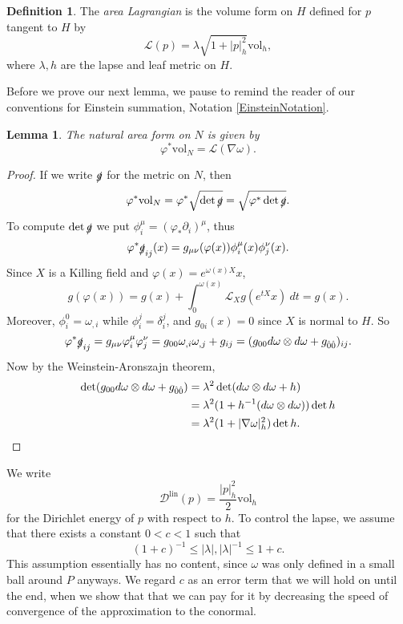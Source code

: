 \documentclass[reqno,12pt,letterpaper]{amsart}
\newcommand{\Lagrange}{\mathscr L}
\newcommand{\DirL}{\mathscr D^{\mathrm{lin}}}
\newcommand{\vol}{\mathrm{vol}}
\newcommand{\dfn}[1]{\emph{#1}\index{#1}}
\newtheorem{lemma}[theorem]{Lemma}
\theoremstyle{definition}
\newtheorem{definition}[theorem]{Definition}
\numberwithin{equation}{section}
\begin{document}
\begin{definition}
The \dfn{area Lagrangian} is the volume form on $H$ defined for $p$ tangent to $H$ by
$$\Lagrange(p) = \lambda \sqrt{1 + |p|_h^2} \vol_h,$$
where $\lambda,h$ are the lapse and leaf metric on $H$.
\end{definition}

Before we prove our next lemma, we pause to remind the reader of our conventions for Einstein summation, Notation \ref{EinsteinNotation}.

\begin{lemma}
The natural area form on $N$ is given by
$$\varphi^* \vol_N = \Lagrange(\nabla \omega).$$
\end{lemma}
\begin{proof}
If we write $\slashed g$ for the metric on $N$, then
$$\varphi^* \vol_N = \varphi^* \sqrt{\det \slashed g} = \sqrt{\varphi^* \det \slashed g}.$$
To compute $\det \slashed g$ we put $\phi_i^\mu = (\varphi_* \partial_i)^\mu$, thus
$$\varphi^* \slashed g_{ij}(x) = g_{\mu\nu}(\varphi(x))\phi^\mu_i(x) \phi^\nu_j(x).$$
Since $X$ is a Killing field and $\varphi(x) = e^{\omega(x)X}x$,
$$g(\varphi(x)) = g(x) + \int_0^{\omega(x)} \mathcal L_X g(e^{tX}x) ~dt = g(x).$$
Moreover, $\phi_i^0 = \omega_{,i}$ while $\phi_i^j = \delta_i^j$, and $g_{0i}(x) = 0$ since $X$ is normal to $H$.
So
$$\varphi^* \slashed g_{ij} = g_{\mu\nu} \varphi_i^\mu \varphi_j^\nu = g_{00} \omega_{,i} \omega_{,j} + g_{ij} = (g_{00}d\omega \otimes d\omega + g_{\hat 0 \hat 0})_{ij}.$$
Now by the Weinstein-Aronszajn theorem,
\begin{align*}
\det(g_{00}d\omega \otimes d\omega + g_{\hat 0 \hat 0})
&= \lambda^2 \det(d\omega \otimes d\omega + h)\\
&= \lambda^2 (1 + h^{-1}(d \omega \otimes d\omega)) \det h \\
&= \lambda^2 (1 + |\nabla \omega|_h^2) \det h. \qedhere
\end{align*}
\end{proof}

We write
$$\DirL(p) = \frac{|p|_h^2}{2}\vol_h$$
for the Dirichlet energy of $p$ with respect to $h$.
To control the lapse, we assume that there exists a constant $0 < c < 1$ such that
$$(1 + c)^{-1} \leq |\lambda|, |\lambda|^{-1} \leq 1 + c.$$
This assumption essentially has no content, since $\omega$ was only defined in a small ball around $P$ anyways.
We regard $c$ as an error term that we will hold on until the end, when we show that that we can pay for it by decreasing the speed of convergence of the approximation to the conormal.
\end{document}
